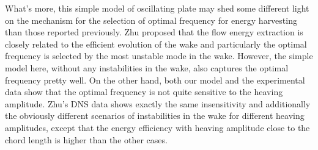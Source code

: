 What's more, this simple model of oscillating plate may shed some different light on the mechanism for the selection of optimal frequency for energy harvesting than those reported previously.
Zhu proposed that the flow energy extraction is closely related to the efficient evolution of the wake and particularly the optimal frequency is selected by the most unstable mode in the wake.
However, the simple model here, without any instabilities in the wake, also captures the optimal frequency pretty well.
On the other hand, both our model and the experimental data show that the optimal frequency is not quite sensitive to the heaving amplitude.
Zhu's DNS data shows exactly the same insensitivity and additionally the obviously different scenarios of instabilities in the wake for different heaving amplitudes, except that the energy efficiency with heaving amplitude close to the chord length is higher than the other cases.
 